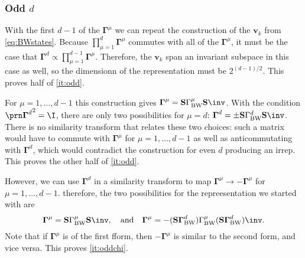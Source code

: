 \documentclass[11pt]{article}
\newcommand{\Gammab}{\boldsymbol{\Gamma}}
\renewcommand{\S}{\mathbf{S}}
\begin{document}
\begin{appendix}

\subsubsection{Odd \texorpdfstring{\(d\)}{d}}\label{sec:oddclass}

With the first \(d-1\) of the \(\Gammab^\mu\) we can repeat the construction of the \(\mathbf{v}_k\) from \cref{eq:BWstates}.
Because \(\prod^{d}_{\mu = 1} \Gammab^\mu\) commutes with all of the \(\Gammab^\mu\), it must be the case that \( \Gammab^d \propto \prod^{d-1}_{\mu = 1} \Gammab^\mu \).
Therefore, the \(\mathbf{v}_k\) span an invariant subspace in this case as well, so the dimensionn of the representation must be \(2^{(d-1)/2}\).
This proves half of \cref{it:odd}.

For \(\mu = 1,\dots,d-1\) this construction gives \( \Gammab^\mu = \S \Gamma^\mu_\text{BW} \S\inv \).
With the condition \(\Gammap[^d]^2 = \I\), there are only two possibilities for \(\mu = d\): \( \Gammab^d = \pm \S \Gamma^d_\text{BW} \S\inv \).
There is no similarity transform that relates these two choices: such a matrix would have to commute with \(\Gammab^\mu\) for \(\mu = 1,\dots,d-1\) as well as anticommutating with \(\Gammab^d\), which would contradict the construction for even \(d\) producing an irrep.
This proves the other half of \cref{it:odd}.

However, we can use \(\Gammab^d\) in a similarity transform to map \(\Gammab^\mu \to - \Gammab^\mu\) for \(\mu = 1,\dots,d-1\).
therefore, the two possibilities for the repreesentation we started with are
%
\begin{equation}\label{eq:similarBWodd}
  \Gammab^\mu = \S \Gamma^\mu_\text{BW} \S\inv,
  \quad \text{and}\quad
  \Gammab^\mu = - (\S \Gammab^d_\text{BW}) \Gamma^\mu_\text{BW} (\S \Gammab^d_\text{BW})\inv.
\end{equation}
%
Note that if \(\Gammab^\mu\) is of the first fform, then \(-\Gammab^\mu\) is similar to the second form, and vice versa. 
This proves \cref{it:oddchi}.


\end{appendix}


\end{document}
